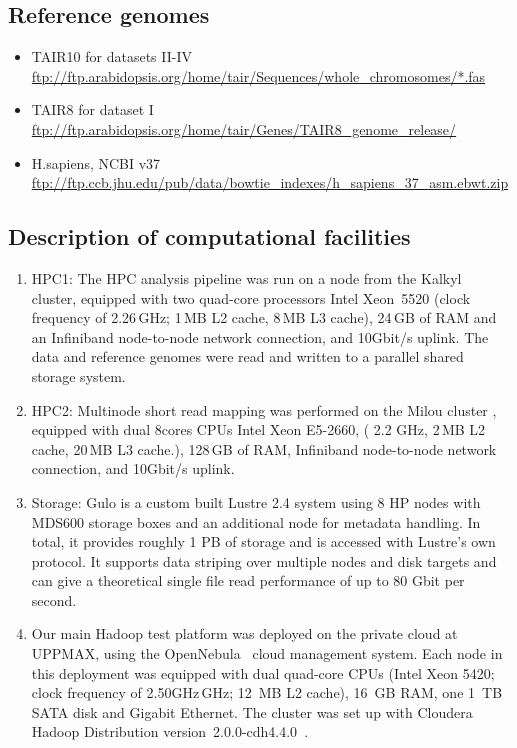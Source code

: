 \documentclass[11pt, oneside]{article}   	%
\begin{document}
\subsection{Reference genomes}
\begin{itemize}
\item TAIR10 for datasets II-IV \url{ftp://ftp.arabidopsis.org/home/tair/Sequences/whole\_chromosomes/*.fas}
\item TAIR8 for dataset I \url{ftp://ftp.arabidopsis.org/home/tair/Genes/TAIR8\_genome\_release/}
\item H.sapiens, NCBI v37 \url{ftp://ftp.ccb.jhu.edu/pub/data/bowtie\_indexes/h\_sapiens\_37\_asm.ebwt.zip}
\end{itemize}

\subsection{Description of computational facilities}

\begin{enumerate}
\item  HPC1:
The HPC analysis pipeline was run on a node from the Kalkyl~\cite{kalkyl} cluster, equipped with two quad-core processors Intel Xeon~5520 (clock frequency of 2.26\,GHz; 1\,MB L2 cache, 8\,MB L3 cache), 24\,GB of RAM and an Infiniband node-to-node network connection, and 10Gbit/s uplink. The data and reference genomes were read and written to a parallel shared storage system. 

\item 
HPC2:
Multinode short read mapping was performed on the Milou cluster\cite{milouCluster} , equipped with dual 8cores CPUs Intel Xeon E5-2660, ( 2.2 GHz, 2\,MB L2 cache, 20\,MB L3 cache.), 128\,GB of RAM, Infiniband node-to-node network connection, and 10Gbit/s uplink.

\item Storage: 
Gulo\cite{gulo} is a custom built Lustre 2.4 system using 8 HP nodes with MDS600 storage boxes and an additional node for metadata handling. In total, it provides roughly 1 PB of storage and is accessed with Lustre's own protocol. It supports data striping over multiple nodes and disk targets and can give a theoretical single file read performance of up to 80 Gbit per second.

\item Our main Hadoop test platform was deployed on the private cloud at UPPMAX, using the OpenNebula~\cite{opennebula} cloud management system. Each node in this deployment was equipped with dual quad-core CPUs (Intel Xeon 5420; clock frequency of 2.50GHz\,GHz; 12~MB L2 cache), 16~GB RAM, one 1~TB SATA disk and Gigabit Ethernet. The cluster was set up with Cloudera Hadoop Distribution version~2.0.0-cdh4.4.0~\cite{cloudera}.

\end{enumerate}



\end{document}
